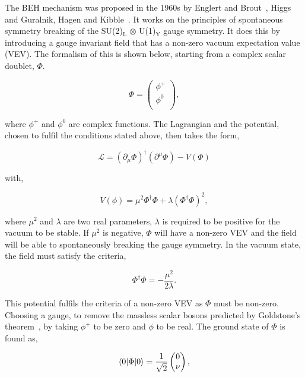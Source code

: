 The BEH mechanism was proposed in the 1960s by Englert and Brout~\cite{Englert:1964et}, Higgs~\cite{Higgs:1964ia,Higgs:1964pj,Higgs:1966ev} and Guralnik, Hagen and Kibble~\cite{Guralnik:1964eu,Kibble:1967sv}.
It works on the principles of spontaneous symmetry breaking of the SU(2)$_{\text{L}}$ $\otimes$ U(1)$_{\text{Y}}$ gauge symmetry.
It does this by introducing a gauge invariant field that has a non-zero vacuum expectation value (VEV).
The formalism of this is shown below, starting from a complex scalar doublet, $\Phi$. 

\begin{equation}
	\Phi = 
	\begin{pmatrix} 
		\phi^{+} \\
		\phi^{0} \\
	\end{pmatrix},
\end{equation}

where $\phi^{+}$ and $\phi^{0}$ are complex functions.
The Lagrangian and the potential, chosen to fulfil the conditions stated above, then takes the form,

\begin{equation}
	\mathcal{L} = (\partial_{\mu}\Phi)^{\dagger} (\partial^{\mu}\Phi) - V(\Phi)
\end{equation}

with,

\begin{equation}
V(\phi) = \mu^2 \Phi^{\dagger} \Phi + \lambda (\Phi^{\dagger} \Phi)^2,
\end{equation}

where $\mu^2$ and $\lambda$ are two real parameters, $\lambda$ is required to be positive for the vacuum to be stable.
If $\mu^2$ is negative, $\Phi$ will have a non-zero VEV and the field will be able to spontaneously breaking the gauge symmetry.
In the vacuum state, the field must satisfy the criteria,

\begin{equation}
\Phi^{\dagger} \Phi = -\frac{\mu^2}{2\lambda}.
\end{equation}

This potential fulfils the criteria of a non-zero VEV as $\Phi$ must be non-zero. 
Choosing a gauge, to remove the massless scalar bosons predicted by Goldstone's theorem~\cite{Goldstone:1961eq}, by taking $\phi^+$ to be zero and $\phi$ to be real.
The ground state of $\Phi$ is found as,

\begin{equation}
\braket{0|\Phi|0} = \frac{1}{\sqrt{2}}
	\begin{pmatrix} 
		0 \\
		\nu \\
	\end{pmatrix},
\end{equation}

